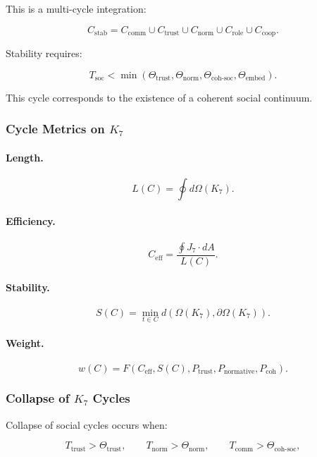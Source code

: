 This is a multi-cycle integration:

\[
  C_{\mathrm{stab}}
    =
    C_{\mathrm{comm}}
    \cup
    C_{\mathrm{trust}}
    \cup
    C_{\mathrm{norm}}
    \cup
    C_{\mathrm{role}}
    \cup
    C_{\mathrm{coop}}.
\]

Stability requires:

\[
  T_{\mathrm{soc}}
  <
  \min(\Theta_{\mathrm{trust}},
       \Theta_{\mathrm{norm}},
       \Theta_{\mathrm{coh\text{-}soc}},
       \Theta_{\mathrm{embed}}).
\]

This cycle corresponds to the existence of a coherent social continuum.

\subsubsection{Cycle Metrics on \texorpdfstring{$K_7$}{K_7}}

\paragraph{Length.}
\[
  L(C)
  = \oint d\Omega(K_7).
\]

\paragraph{Efficiency.}
\[
  C_{\mathrm{eff}}
    =
    \frac{\oint J_7\cdot dA}{L(C)}.
\]

\paragraph{Stability.}
\[
 S(C)
  = \min_{t\in C}
    d(\Omega(K_7), \partial\Omega(K_7)).
\]

\paragraph{Weight.}
\[
 w(C)
 =
 F(C_{\mathrm{eff}},S(C),
   P_{\mathrm{trust}},
   P_{\mathrm{normative}},
   P_{\mathrm{coh}}).
\]

\subsubsection{Collapse of \texorpdfstring{$K_7$}{K_7} Cycles}

Collapse of social cycles occurs when:

\[
 T_{\mathrm{trust}} > \Theta_{\mathrm{trust}},
 \qquad
 T_{\mathrm{norm}} > \Theta_{\mathrm{norm}},
 \qquad
 T_{\mathrm{comm}} > \Theta_{\mathrm{coh\text{-}soc}},
\]

